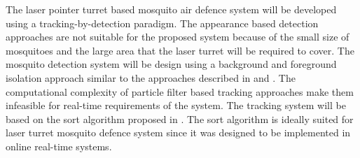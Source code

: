 The laser pointer turret based mosquito air defence system will be developed using a tracking-by-detection paradigm. The appearance based detection approaches are not suitable for the proposed system because of the small size of mosquitoes and the large area that the laser turret will be required to cover. The mosquito detection system will be design using a background and foreground isolation approach similar to the approaches described in \cite{Liang2016} and \cite{Bao2018}. The computational complexity of particle filter based tracking approaches make them infeasible for real-time requirements of the system. The tracking system will be based on the \gls{sort} algorithm proposed in \cite{SORT-Bewley2017}. The \gls{sort} algorithm is ideally suited for laser turret mosquito defence system since it was designed to be implemented in online real-time systems.

\newpage



